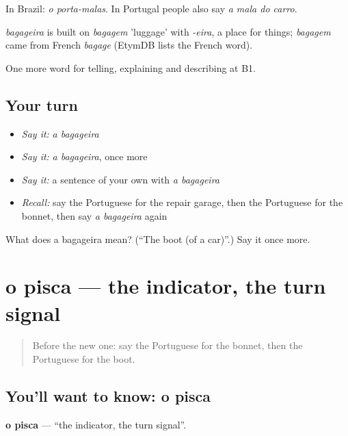 In Brazil: \emph{o porta-malas}. In Portugal people also say \emph{a mala do carro}.

\begin{cousinweb}
\emph{bagageira} is built on \emph{bagagem} 'luggage' with \emph{-eira}, a place for things; \emph{bagagem} came from French \emph{bagage} (EtymDB lists the French word).
\end{cousinweb}

\begin{grammarlens}[title={What you've built}]
One more word for telling, explaining and describing at B1.
\end{grammarlens}

\subsection*{Your turn}
\begin{itemize}
\raggedright
  \item \emph{Say it:} \emph{a bagageira}
  \item \emph{Say it:} \emph{a bagageira}, once more
  \item \emph{Say it:} a sentence of your own with \emph{a bagageira}
  \item \emph{Recall:} say the Portuguese for the repair garage, then the Portuguese for the bonnet, then say \emph{a bagageira} again
\end{itemize}

\begin{tcolorbox}[breakable,colback=teal!4,colframe=teal!35!black,title={Before you move on}]
What does a bagageira mean? (\textquotedblleft{}The boot (of a car)\textquotedblright{}.) Say it once more.
\end{tcolorbox}
\section[o pisca]{o pisca — the indicator, the turn signal}

\label{lesson:PT-C407-pisca}



\begin{quote}
Before the new one: say the Portuguese for the bonnet, then the Portuguese for the boot.
\end{quote}

\subsection*{You'll want to know: o pisca}
\textbf{o pisca} — \textquotedblleft{}the indicator, the turn signal\textquotedblright{}.

